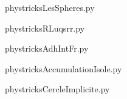     

    \clearpage
    


    \newcommand{\CaptionFigLesSpheres}{<+Type your caption here+>}
    \begin{center}
        
    \end{center}
    phystricksLesSpheres.py

    

    \clearpage
    


    \newcommand{\CaptionFigRLuqsrr}{<+Type your caption here+>}
    \begin{center}
        
    \end{center}
    phystricksRLuqsrr.py

    

    \clearpage
    


    \newcommand{\CaptionFigAdhIntFr}{<+Type your caption here+>}
    \begin{center}
        
    \end{center}
    phystricksAdhIntFr.py

    

    \clearpage
    


    \newcommand{\CaptionFigAccumulationIsole}{<+Type your caption here+>}
    \begin{center}
        
    \end{center}
    phystricksAccumulationIsole.py

    

    \clearpage
    


    \newcommand{\CaptionFigCercleImplicite}{<+Type your caption here+>}
    \begin{center}
        
    \end{center}
    phystricksCercleImplicite.py

    

    \clearpage
    


